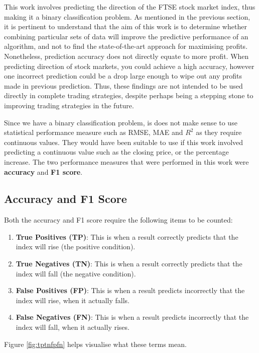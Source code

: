 \documentclass{UoYCSproject}
\begin{document}
This work involves predicting the direction of the FTSE stock market index, thus making it a binary classification problem. As mentioned in the previous section, it is pertinent to understand that the aim of this work is to determine whether combining particular sets of data will improve the predictive performance of an algorithm, and not to find the state-of-the-art approach for maximising profits. Nonetheless, prediction accuracy does not directly equate to more profit. When predicting direction of stock markets, you could achieve a high accuracy, however one incorrect prediction could be a drop large enough to wipe out any profits made in previous prediction. Thus, these findings are not intended to be used directly in complete trading strategies, despite perhaps being a stepping stone to improving trading strategies in the future. 

Since we have a binary classification problem, is does not make sense to use statistical performance measure such as RMSE, MAE and $R^2$ as they require continuous values. They would have been suitable to use if this work involved predicting a continuous value such as the closing price, or the percentage increase. The two performance measures that were performed in this work were \textbf{accuracy} and \textbf{F1 score}. 

\subsection{Accuracy and F1 Score}

Both the accuracy and F1 score require the following items to be counted:

\begin{enumerate}
    \item \textbf{True Positives (TP)}: This is when a result correctly predicts that the index will rise (the positive condition).
    \item \textbf{True Negatives (TN)}: This is when a result correctly predicts that the index will fall (the negative condition).
    \item \textbf{False Positives (FP)}: This is when a result predicts incorrectly that the index will rise, when it actually falls.
    \item \textbf{False Negatives (FN)}: This is when a result predicts incorrectly that the index will fall, when it actually rises.
\end{enumerate}

Figure \ref{fig:tptnfpfn} helps visualise what these terms mean.
\end{document}
